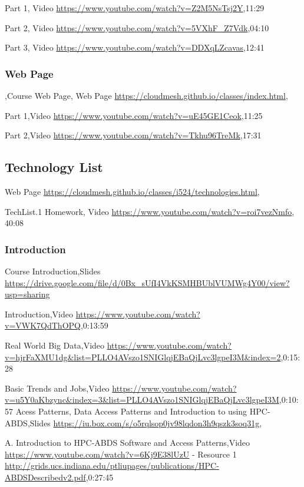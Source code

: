 \documentclass{article}
\begin{document}
Part 1, Video \url{https://www.youtube.com/watch?v=Z2M5NsTsj2Y},11:29

Part 2, Video \url{https://www.youtube.com/watch?v=5VXhF_Z7Vdk},04:10

Part 3, Video \url{https://www.youtube.com/watch?v=DDXqLZcavas},12:41

\subsubsection{Web Page}

,Course Web Page, Web Page \url{https://cloudmesh.github.io/classes/index.html},

Part 1,Video \url{https://www.youtube.com/watch?v=uE45GE1Ceok},11:25

Part 2,Video \url{https://www.youtube.com/watch?v=Tkhu96TreMk},17:31

\subsection{Technology List}

Web Page \url{https://cloudmesh.github.io/classes/i524/technologies.html}, 

TechList.1 Homework, Video \url{https://www.youtube.com/watch?v=roi7vezNmfo}, 40:08

\subsubsection{Introduction }

Course Introduction,Slides \url{https://drive.google.com/file/d/0Bx_sUfI4VkKSMHBUblVUMWg4Y00/view?usp=sharing}

Introduction,Video \url{https://www.youtube.com/watch?v=VWK7QdThOPQ},0:13:59

Real World Big Data,Video \url{https://www.youtube.com/watch?v=hjrFaXMU1dg&list=PLLO4AVszo1SNIGlqjEBaQjLvc3lgpeI3M&index=2},0:15:28

Basic Trends and Jobs,Video \url{https://www.youtube.com/watch?v=u5Y0aKbzync&index=3&list=PLLO4AVszo1SNIGlqjEBaQjLvc3lgpeI3M},0:10:57
Acess Patterns, Data Access Patterns and Introduction to using HPC-ABDS,Slides \url{https://iu.box.com/s/o5rqlsop0jv98lqdon3h9qszk3soq31g},

A. Introduction to HPC-ABDS Software and Access Patterns,Video \url{https://www.youtube.com/watch?v=6Kj9E38lUzU} -  Resource 1 \url{http://grids.ucs.indiana.edu/ptliupages/publications/HPC-ABDSDescribedv2.pdf},0:27:45
\end{document}

